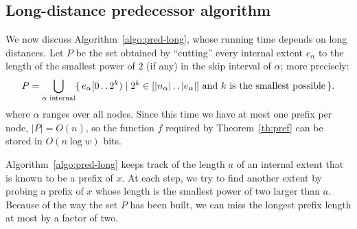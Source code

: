 \documentclass[a4paper,11pt]{article}
\newcommand{\?}{\mskip1.5mu}
\def\..{\,\mathpunct{\ldotp\ldotp}} %
\begin{document}
\subsection{Long-distance predecessor algorithm}
\label{sec:long}

We now discuss Algorithm~\ref{algo:pred-long}, whose running time depends on long
distances. Let $P$ be the set obtained by ``cutting''
every internal extent $e_\alpha$ to the length of the smallest power of $2$ (if
any) in the skip interval of $\alpha$; more precisely:
\[
	P=\bigcup_\text{$\alpha$ internal}\{\,e_\alpha[0\..2^k) \mid 2^k \in
	[|n_\alpha|\..|e_\alpha|] \text{ and $k$ is the smallest possible}\,\}.
\]
where $\alpha$ ranges over all nodes. Since this time we
have at most one prefix per node, $|P|=O(n)$, so the function $f$ required by
Theorem~\ref{th:pref} can be stored in $O(n\log w)$ bits. 

Algorithm~\ref{algo:pred-long} keeps track of the length $a$ of an
internal extent that is known to be a prefix of $x$. At each step, we try to
find another extent by probing a prefix of $x$ whose length is the smallest power of two larger than
$a$. Because of the way the set $P$ has been built, we can miss the longest
prefix length at most by a factor of two. 
\end{document}
